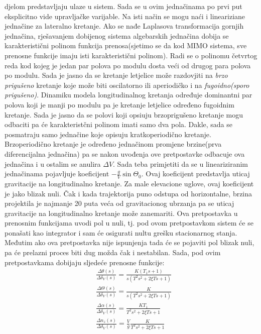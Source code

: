 djelom predstavljaju ulaze u sistem. Sada se u ovim jednačinama po prvi put eksplicitno vide upravljačke varijable.  
Na isti način se mogu naći i lineariziane jednačine za lateralno kretanje.
Ako se nađe Laplasova transformacija gornjih jednačina, rješavanjem dobijenog sistema algebarskih jednačina 
dobija se karakteristični polinom funkcija prenosa(sjetimo se da kod MIMO sistema, sve prenosne funkcije imaju isti karakteristični polinom). 
Radi se o polinomu četvrtog reda kod kojeg je jedan par polova po modulu dosta veći od drugog para polova po modulu. 
Sada je jasno da se kretanje letjelice može razdovjiti na \textit{brzo prigušeno} kretanje koje može biti oscilatorno 
ili aperiodičko i na \textit{fugoidno(sporo prigušeno)}. Dinamiku modela longitudinalnog kretanja određuje 
dominantni par polova koji je manji po modulu pa je kretanje letjelice određeno fugoidnim kretanje. Sada je jasno da se 
polovi koji opsiuju brzoprigušeno kretanje mogu odbaciti pa će karakteristčni polinom imati samo dva pola. 
Dakle, sada se posmatraju samo jednačine koje opisuju kratkoperiodično kretanje. Brzoperiodično kretanje je 
određeno jednačinom promjene brzine(prva diferencijalna jednačina) pa se nakon uvođenja ove pretpostavke odbacuje ova 
jednačina  i u ostalim se anulira $\Delta V$. Sada teba primjetiti da se u lineariziranim jednačinama pojavljuje koeficijent 
$-\frac{g}{V}\sin\Theta_0$. Ovaj koeficijent predstavlja uticaj gravitacije na longitudinalno kretanje. Za male elevacione 
uglove, ovaj koeficijent je jako blizak nuli. Čak i kada trajektorija puno odstupa od horizontalne, brzina projektila 
je najmanje 20 puta veća od gravitacionog ubrzanja pa se uticaj gravitacije na longitudinalno kretanje može zanemariti. 
Ova pretpostavka u prenosnim funkcijama uvodi pol u nuli, tj. pod ovom pretpostavkom sistem će se ponašati kao integrator i 
sam će osigurati nultu grešku stacionarnog stanja. Međutim ako ova pretpostavka nije ispunjenja tada će se pojaviti pol blizak nuli, 
pa će prelazni proces biti dug možda čak i nestabilan. Sada, pod ovim pretpostavkama dobijaju sljedeće prenosne funkcije:
\begin{align}
    &\frac{\Delta \theta(s)}{\Delta \delta_V(s)}=\frac{K(T_1s+1)}{s(T^2s^2+2\xi Ts+1)}\\
    &\frac{\Delta \Theta(s)}{\Delta \delta_V(s)}=\frac{K}{s(T^2s^2+2\xi Ts+1)}\\
    &\frac{\Delta \alpha(s)}{\Delta \delta_V(s)}=\frac{KT_1}{T^2s^2+2\xi Ts+1}\\
    &\frac{\Delta n_z(s)}{\Delta \delta_V(s)}=\frac{V}{g}\frac{K}{T^2s^2+2\xi Ts+1}
\end{align}

